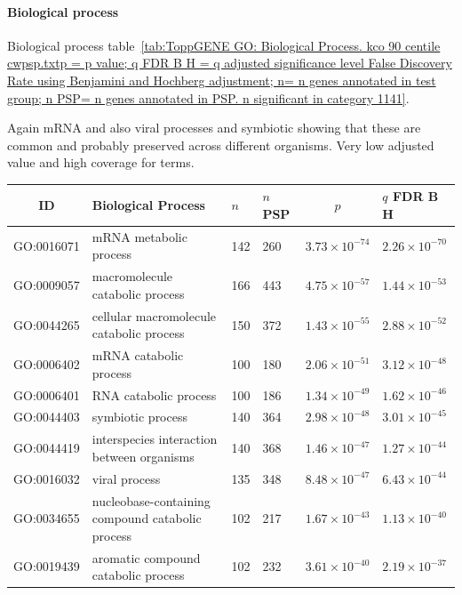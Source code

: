 \paragraph{Biological process}
Biological process table~\ref{tab:ToppGENE GO: Biological Process. kco 90 centile cwpsp.txtp = p value; q FDR B H = q adjusted significance level False Discovery Rate using Benjamini and Hochberg adjustment; n= n genes annotated in test group; n PSP= n genes annotated in PSP. n significant in category 1141}.

Again mRNA and also viral processes and symbiotic showing that these are common and probably preserved across different organisms. Very low adjusted value and high coverage for terms.


  \begin{table}[ht]
\centering
\begin{adjustbox}{width=\textwidth}
\setlength{\extrarowheight}{2pt}
\begin{tabular}{@{}clllcl@{}}
  \toprule
  ID & Biological Process & $n$ & $n$ PSP & $p$ & $q$ FDR B H \\ 

  \midrule
GO:0016071 & mRNA metabolic process & 142 & 260 & $3.73 \times 10^{-74}$ & $2.26 \times 10^{-70}$ \\ 
  GO:0009057 & macromolecule catabolic process & 166 & 443 & $4.75 \times 10^{-57}$ & $1.44 \times 10^{-53}$ \\ 
  GO:0044265 & cellular macromolecule catabolic process & 150 & 372 & $1.43 \times 10^{-55}$ & $2.88 \times 10^{-52}$ \\ 
  GO:0006402 & mRNA catabolic process & 100 & 180 & $2.06 \times 10^{-51}$ & $3.12 \times 10^{-48}$ \\ 
  GO:0006401 & RNA catabolic process & 100 & 186 & $1.34 \times 10^{-49}$ & $1.62 \times 10^{-46}$ \\ 
  GO:0044403 & symbiotic process & 140 & 364 & $2.98 \times 10^{-48}$ & $3.01 \times 10^{-45}$ \\ 
  GO:0044419 & interspecies interaction between organisms & 140 & 368 & $1.46 \times 10^{-47}$ & $1.27 \times 10^{-44}$ \\ 
  GO:0016032 & viral process & 135 & 348 & $8.48 \times 10^{-47}$ & $6.43 \times 10^{-44}$ \\ 
  GO:0034655 & nucleobase-containing compound catabolic process & 102 & 217 & $1.67 \times 10^{-43}$ & $1.13 \times 10^{-40}$ \\ 
  GO:0019439 & aromatic compound catabolic process & 102 & 232 & $3.61 \times 10^{-40}$ & $2.19 \times 10^{-37}$ \\ 
   \bottomrule
\end{tabular}
\end{adjustbox}


\end{table}
